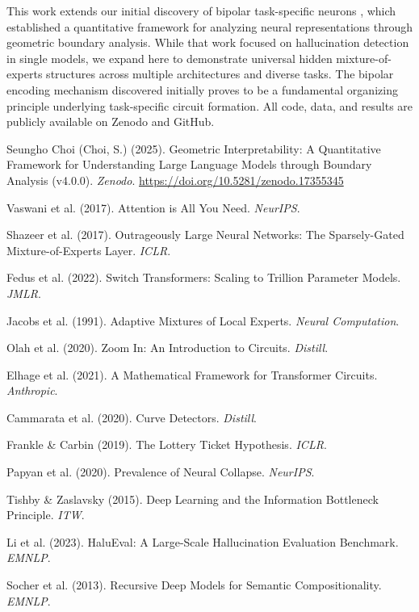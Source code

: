 \documentclass{article}
\begin{document}
This work extends our initial discovery of bipolar task-specific neurons \cite{zenodo17355345}, which established a quantitative framework for analyzing neural representations through geometric boundary analysis. While that work focused on hallucination detection in single models, we expand here to demonstrate universal hidden mixture-of-experts structures across multiple architectures and diverse tasks. The bipolar encoding mechanism discovered initially proves to be a fundamental organizing principle underlying task-specific circuit formation. All code, data, and results are publicly available on Zenodo and GitHub.

\begin{thebibliography}{99}

Seungho Choi (Choi, S.) (2025). Geometric Interpretability: A Quantitative Framework for Understanding Large Language Models through Boundary Analysis (v4.0.0). \textit{Zenodo}. \url{https://doi.org/10.5281/zenodo.17355345}

Vaswani et al. (2017). Attention is All You Need. \textit{NeurIPS}.

Shazeer et al. (2017). Outrageously Large Neural Networks: The Sparsely-Gated Mixture-of-Experts Layer. \textit{ICLR}.

Fedus et al. (2022). Switch Transformers: Scaling to Trillion Parameter Models. \textit{JMLR}.

Jacobs et al. (1991). Adaptive Mixtures of Local Experts. \textit{Neural Computation}.

Olah et al. (2020). Zoom In: An Introduction to Circuits. \textit{Distill}.

Elhage et al. (2021). A Mathematical Framework for Transformer Circuits. \textit{Anthropic}.

Cammarata et al. (2020). Curve Detectors. \textit{Distill}.

Frankle \& Carbin (2019). The Lottery Ticket Hypothesis. \textit{ICLR}.

Papyan et al. (2020). Prevalence of Neural Collapse. \textit{NeurIPS}.

Tishby \& Zaslavsky (2015). Deep Learning and the Information Bottleneck Principle. \textit{ITW}.

Li et al. (2023). HaluEval: A Large-Scale Hallucination Evaluation Benchmark. \textit{EMNLP}.

Socher et al. (2013). Recursive Deep Models for Semantic Compositionality. \textit{EMNLP}.

\end{thebibliography}
\end{document}

